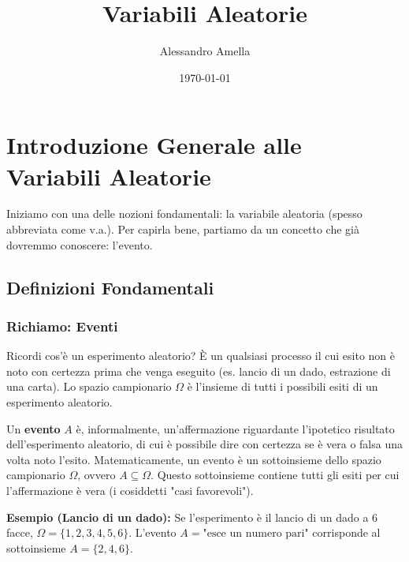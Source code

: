 

\title{Variabili Aleatorie}
\author{Alessandro Amella}
\date{\today}


\maketitle
\tableofcontents
\newpage

\chapter{Introduzione Generale alle Variabili Aleatorie}

Iniziamo con una delle nozioni fondamentali: la variabile aleatoria (spesso abbreviata come v.a.). Per capirla bene, partiamo da un concetto che già dovremmo conoscere: l'evento.

\section{Definizioni Fondamentali}

\subsection{Richiamo: Eventi}
Ricordi cos'è un esperimento aleatorio? È un qualsiasi processo il cui esito non è noto con certezza prima che venga eseguito (es. lancio di un dado, estrazione di una carta).
Lo spazio campionario $\Omega$ è l'insieme di tutti i possibili esiti di un esperimento aleatorio.

Un \textbf{evento} $A$ è, informalmente, un'affermazione riguardante l'ipotetico risultato dell'esperimento aleatorio, di cui è possibile dire con certezza se è vera o falsa una volta noto l'esito. Matematicamente, un evento è un sottoinsieme dello spazio campionario $\Omega$, ovvero $A \subseteq \Omega$. Questo sottoinsieme contiene tutti gli esiti per cui l'affermazione è vera (i cosiddetti "casi favorevoli").

\begin{example}
\textbf{Esempio (Lancio di un dado):}
Se l'esperimento è il lancio di un dado a 6 facce, $\Omega = \{1, 2, 3, 4, 5, 6\}$.
L'evento $A = \text{"esce un numero pari"}$ corrisponde al sottoinsieme $A = \{2, 4, 6\}$.
\end{example}

